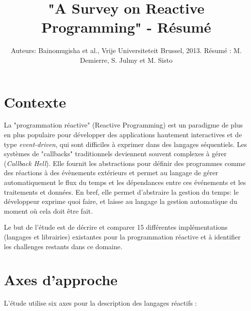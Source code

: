 \documentclass[10pt,final]{IEEEtran}
\begin{document}

\title{"A Survey on Reactive Programming" - Résumé}

\author{Auteurs: Bainomugisha et al., Vrije Universiteteit Brussel, 2013. Résumé : M. Demierre, S. Julmy et M. Sisto\vspace{-4.5ex}}

\maketitle

\section{Contexte}

La "programmation réactive" (Reactive Programming) est un paradigme de plus en plus populaire pour développer des applications hautement interactives et de type \textit{event-driven}, qui sont difficiles à exprimer dans des langages séquentiels. Les systèmes de "callbacks" traditionnels deviennent souvent complexes à gérer (\textit{Callback Hell}). Elle fournit les abstractions pour définir des programmes comme des réactions à des évènements extérieurs et permet au langage de gérer automatiquement le flux du temps et les dépendances entre ces événements et les traitements et données. En bref, elle permet d'abstraire la gestion du temps: le développeur exprime quoi faire, et laisse au langage la gestion automatique du moment où cela doit être fait. 

Le but de l'étude est de décrire et comparer 15 différentes implémentations (langages et librairies) existantes pour la programmation réactive et à identifier les challenges restants dans ce domaine.

\section{Axes d'approche}
L'étude utilise six axes pour la description des langages réactifs :
\end{document}
